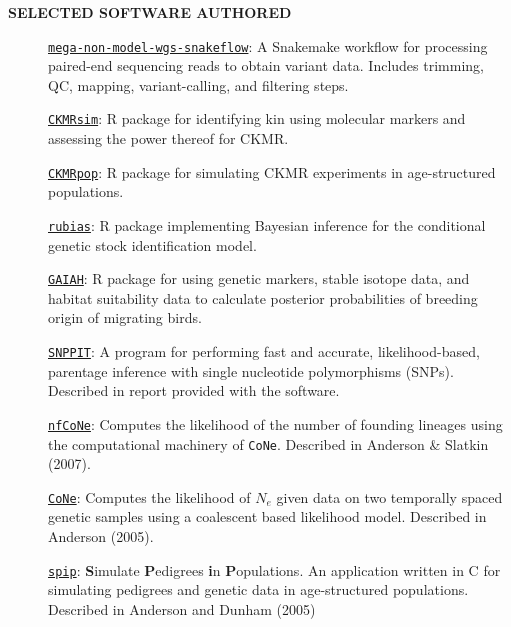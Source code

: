 \documentclass[11pt]{article}
\newlength{\postskip}
\begin{document}
\vspace*{\postskip}

{\bf SELECTED SOFTWARE AUTHORED}
\begin{description}
\item[]\href{https://github.com/eriqande/mega-non-model-wgs-snakeflow}{\texttt{mega-non-model-wgs-snakeflow}}: A Snakemake workflow for processing paired-end sequencing reads to obtain variant data.  Includes trimming, QC, mapping, variant-calling, and filtering steps.  
\item[]\href{https://github.com/eriqande/CKMRsim}{\texttt{CKMRsim}}: R package for identifying kin using molecular markers and assessing the power thereof for CKMR.
\item[]\href{https://CRAN.R-project.org/package=CKMRpop}{\texttt{CKMRpop}}: R package for simulating CKMR experiments in age-structured populations.
\item[]\href{https://CRAN.R-project.org/package=rubias}{\texttt{rubias}}: R package implementing Bayesian inference for the conditional genetic stock identification model.
\item[]\href{https://CRAN.R-project.org/package=gaiah}{\texttt{GAIAH}}: R package for using genetic markers, stable isotope data, and habitat suitability data to calculate posterior probabilities of breeding origin of migrating birds.
\item[]\href{http://swfsc.noaa.gov//staff.aspx?Division=FED&id=740}{\texttt{SNPPIT}}:  
A program for performing fast and accurate, likelihood-based, parentage inference with single nucleotide polymorphisms (SNPs).  Described in report provided with the software.
\item[]\href{http://users.soe.ucsc.edu/~eriq/dokuwiki/doku.php?id=software:nfcone:nfcone_main}{{\tt nfCoNe}}: Computes the likelihood of the number of founding lineages using the computational machinery of {\tt CoNe}.  Described in Anderson \& Slatkin (2007).
\item[]\href{http://swfsc.noaa.gov//staff.aspx?Division=FED&id=740}{\texttt{CoNe}}:  Computes the likelihood of $N_e$ given data on two temporally spaced genetic samples using a coalescent based likelihood model. Described in Anderson (2005).
\item[]\href{http://swfsc.noaa.gov//staff.aspx?Division=FED&id=740}{\texttt{spip}}: {\bf S}imulate {\bf P}edigrees {\bf i}n {\bf P}opulations.  An application written in C for simulating pedigrees and genetic data in age-structured populations.  Described in Anderson and Dunham (2005)

\end{description}
\end{document}
